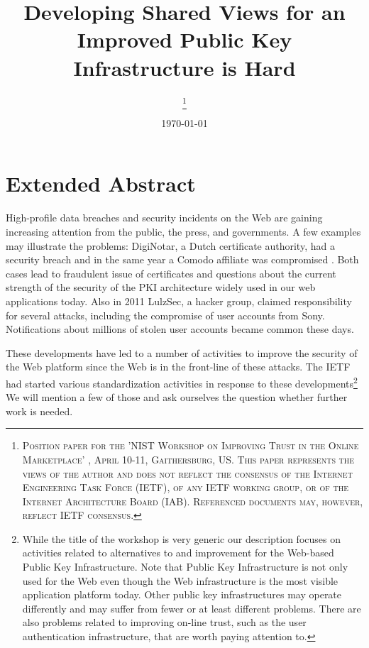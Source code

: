 \documentclass[a4paper, 10pt]{IEEEtran}
\begin{document}
\title{Developing Shared Views for an Improved Public Key Infrastructure  is Hard}
\author{
\thanks{\textsc{
Position paper for the 'NIST Workshop on Improving Trust in the Online Marketplace' , April 10-11, Gaithersburg, US. This paper represents the views of the author and does not reflect the consensus of the Internet Engineering Task Force (IETF), of any IETF working group, or of the Internet Architecture Board (IAB). Referenced documents may, however, reflect IETF consensus.}}
}

\date{\today}

\maketitle

\section{Extended Abstract}

High-profile data breaches and security incidents on the Web are gaining increasing attention from the public, the press, and governments. A few examples may illustrate the problems: DigiNotar, a Dutch certificate authority, had a security breach \cite{DigiNotar} and in the same year a Comodo affiliate was compromised \cite{comodo}. Both cases lead to fraudulent issue of certificates and questions about the current strength of the security of the PKI architecture widely used in our web applications today. Also in 2011 LulzSec, a hacker group, claimed responsibility for several attacks, including the compromise of user accounts from Sony. Notifications about millions of stolen user accounts became common these days. 

These developments have led to a number of activities to improve the security of the Web platform since the Web is in the front-line of these attacks. The IETF had started various standardization activities in response to these developments\footnote{While the title of the workshop is very generic our description focuses on activities related to alternatives to and improvement for the Web-based Public Key Infrastructure. Note that Public Key Infrastructure is not only used for the Web even though the Web infrastructure is the most visible application platform today. Other public key infrastructures may operate differently and may suffer from fewer or at least different problems. There are also problems related to improving on-line trust, such as the user authentication infrastructure, that are worth paying attention to.} We will mention a few of those and ask ourselves the question whether further work is needed. 
\end{document}
